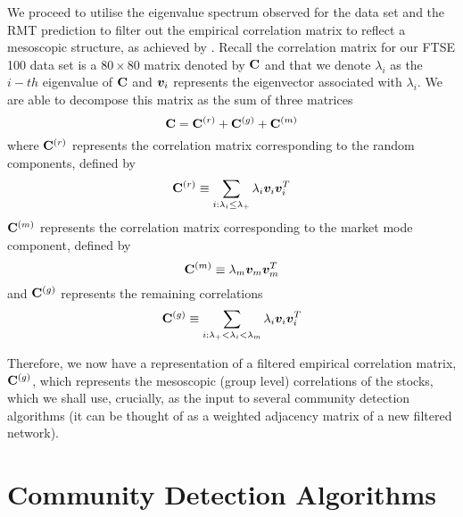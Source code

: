 We proceed to utilise the eigenvalue spectrum observed for the data set and the RMT prediction to filter out the empirical correlation matrix to reflect a mesoscopic structure, as achieved by \cite{MG13}. Recall the correlation matrix for our FTSE 100 data set is a $80 \times 80$ matrix denoted by $\mathbf C$ and that we denote $\lambda_{i}$ as the $i-th$ eigenvalue of $\mathbf C$ and $\vecvar{v_{i}}$ represents the eigenvector associated with $\lambda_{i}$. We are able to decompose this matrix as the sum of three matrices
\begin{equation}
\label{eq:decompositionCorrelationMatrix}
	\mathbf C = \mathbf C^{(r)} + \mathbf C^{(g)} + \mathbf C^{(m)}
\end{equation}
where $\mathbf C^{(r)}$ represents the correlation matrix corresponding to the random components, defined by
\begin{equation}
\label{eq:randomCorrelationMatrix}
	\matvar{C}^{(r)} \equiv \sum_{i:\lambda_{i}\leq\lambda_{+}} \lambda_{i} \vecvar{v_{i}} \transpose{\vecvar{v_{i}}}
\end{equation}
$\mathbf C^{(m)}$ represents the correlation matrix corresponding to the market mode component, defined by
\begin{equation}
\label{eq:marketModeCorrelationMatrix}
	\matvar{C}^{(m)} \equiv \lambda_{m} \vecvar{v_{m}} \transpose{\vecvar{v_{m}}}
\end{equation}
and $\mathbf C^{(g)}$ represents the remaining correlations
\begin{equation}
\label{eq:remainingCorrelationMatrix}
	\matvar{C}^{(g)} \equiv \sum_{i:\lambda_{+} < \lambda_{i} < \lambda_{m}} \lambda_{i} \vecvar{v_{i}} \transpose{\vecvar{v_{i}}}
\end{equation}

Therefore, we now have a representation of a filtered empirical correlation matrix, $\mathbf C^{(g)}$, which represents the mesoscopic (group level) correlations of the stocks, which we shall use, crucially, as the input to several community detection algorithms (it can be thought of as a weighted adjacency matrix of a new filtered network).


\section{Community Detection Algorithms}
\label{sec:communityDetectionAlgorithms}

